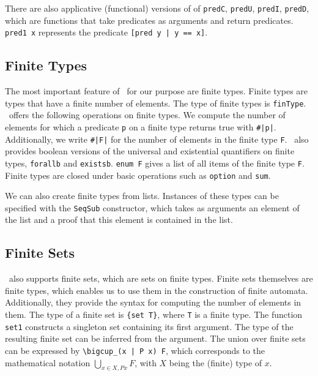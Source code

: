 

There are also applicative (functional) versions of of \lstinline{predC}, \lstinline{predU}, \lstinline{predI}, \lstinline{predD}, 
which are functions that take predicates as arguments and return predicates.
\lstinline{pred1 x} represents the predicate \lstinline{[pred y | y == x]}.

\subsection{Finite Types} %
The most important feature of \ssreflect\ for our purpose are finite types.  
Finite types are types that have a finite number of elements.
The type of finite types is \lstinline{finType}.
\ssreflect\ offers the following operations on finite types.
We compute the number of elements for which a predicate \lstinline{p} on a finite type returns true with \lstinline{#|p|}.
Additionally, we write \lstinline{#|F|} for the number of elements in the finite type \lstinline{F}.
\ssreflect\ also provides boolean versions of the universal and existential quantifiers on finite types, \lstinline{forallb} and \lstinline{existsb}.
\lstinline{enum F} gives a list of all items of the finite type \lstinline{F}. 
Finite types are closed under basic operations such as \lstinline{option} and \lstinline{sum}.

We can also create finite types from lists.
Instances of these types can be specified with the \lstinline{SeqSub} constructor, 
which takes as arguments an element of the list and a proof that this element is contained in the list.

\subsection{Finite Sets}
\ssreflect\ also supports finite sets, which are sets on finite types.
Finite sets themselves are finite types, which enables us to use them in the construction of finite automata.
Additionally, they provide the syntax for computing the number of elements in them.
The type of a finite set is \lstinline!{set T}!, where \lstinline{T} is a finite type.
The function \lstinline{set1} constructs a singleton set containing its first argument. 
The type of the resulting finite set can be inferred from the argument. 
The union over finite sets can be expressed by \lstinline{\bigcup_(x | P x) F}, 
which corresponds to the mathematical notation $\bigcup_{x \in X, P x} F$, with $X$ being the (finite) type of $x$.


